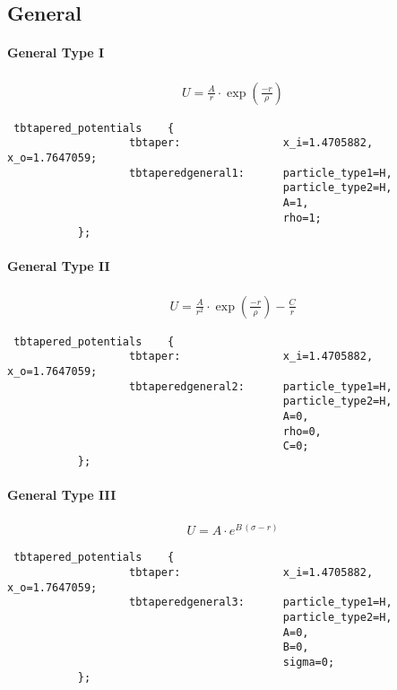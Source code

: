 \subsection{General}
\label{subsec:NonBondGeneral}
\paragraph{General Type I}
\begin{align*}
U = \frac{A}{r}\cdot \exp(\frac{-r}{\rho})
\end{align*}
\begin{lstlisting}
 tbtapered_potentials    {
                   tbtaper:                x_i=1.4705882,  x_o=1.7647059;
                   tbtaperedgeneral1:      particle_type1=H,
                                           particle_type2=H,
                                           A=1,
                                           rho=1;
           };
\end{lstlisting}

\paragraph{General Type II}
\begin{align*}
U = \frac{A}{r^2}\cdot \exp(\frac{-r}{\rho})-\frac{C}{r}
\end{align*}
\begin{lstlisting}
 tbtapered_potentials    {
                   tbtaper:                x_i=1.4705882,  x_o=1.7647059;
                   tbtaperedgeneral2:      particle_type1=H,
                                           particle_type2=H,
                                           A=0,
                                           rho=0,
                                           C=0;
           };
\end{lstlisting}

\paragraph{General Type III}
\begin{align*}
    U = A \cdot e^{B\,(\sigma - r)}
\end{align*}
\begin{lstlisting}
 tbtapered_potentials    {
                   tbtaper:                x_i=1.4705882,  x_o=1.7647059;
                   tbtaperedgeneral3:      particle_type1=H,
                                           particle_type2=H,
                                           A=0,
                                           B=0,
                                           sigma=0;
           };
\end{lstlisting}
